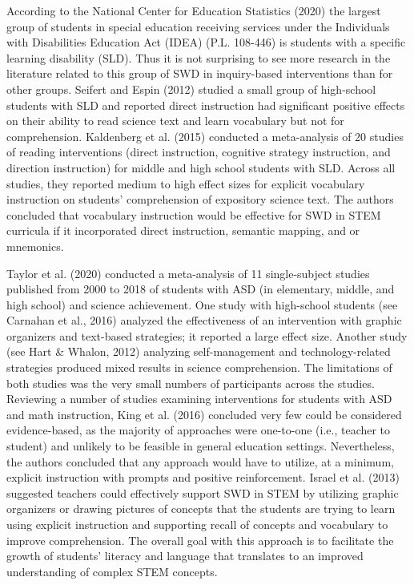\documentclass[11.5pt]{sig-alternate}
\begin{document}
\begin{large}
According to the National Center for Education Statistics (2020) the largest group of students in special education receiving services under the Individuals with Disabilities Education Act (IDEA) (P.L. 108-446) is students with a specific learning disability (SLD). Thus it is not surprising to see more research in the literature related to this group of SWD in inquiry-based interventions than for other groups. Seifert and Espin (2012) studied a small group of high-school students with SLD and reported direct instruction had significant positive effects on their ability to read science text and learn vocabulary but not for comprehension. Kaldenberg et al. (2015) conducted a meta-analysis of 20 studies of reading interventions (direct instruction, cognitive strategy instruction, and direction instruction) for middle and high school students with SLD. Across all studies, they reported medium to high effect sizes for explicit vocabulary instruction on students’ comprehension of expository science text. The authors concluded that vocabulary instruction would be effective for SWD in STEM curricula if it incorporated direct instruction, semantic mapping, and or mnemonics.         

Taylor et al. (2020) conducted a meta-analysis of 11 single-subject studies published from 2000 to 2018 of students with ASD (in elementary, middle, and high school) and science achievement. One study with high-school students (see Carnahan et al., 2016) analyzed the effectiveness of an intervention with graphic organizers and text-based strategies; it reported a large effect size. Another study (see Hart \& Whalon, 2012) analyzing self-management and technology-related strategies produced mixed results in science comprehension. The limitations of both studies was the very small numbers of participants across the studies. Reviewing a number of studies examining interventions for students with ASD and math instruction, King et al. (2016) concluded very few could be considered evidence-based, as the majority of approaches were one-to-one (i.e., teacher to student) and unlikely to be feasible in general education settings. Nevertheless, the authors concluded that any approach would have to utilize, at a minimum, explicit instruction with prompts and positive reinforcement. Israel et al. (2013) suggested teachers could effectively support SWD in STEM by utilizing graphic organizers or drawing pictures of concepts that the students are trying to learn using explicit instruction and supporting recall of concepts and vocabulary to improve comprehension. The overall goal with this approach is to facilitate the growth of students’ literacy and language that translates to an improved understanding of complex STEM concepts.     


\end{large}
\end{document}
